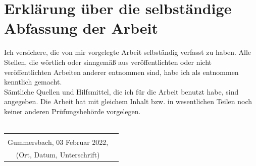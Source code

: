 \documentclass[a4paper,12pt,oneside]{article}
\begin{document}
\section*{Erklärung über die selbständige\\Abfassung der Arbeit} %
Ich versichere, die von mir vorgelegte Arbeit selbständig verfasst zu haben.
Alle Stellen, die wörtlich oder sinngemäß aus veröffentlichten oder nicht veröffentlichten Arbeiten anderer entnommen sind,
habe ich als entnommen kenntlich gemacht.\\
Sämtliche Quellen und Hilfsmittel, die ich für die Arbeit benutzt habe, sind
angegeben. Die Arbeit hat mit gleichem Inhalt bzw. in wesentlichen Teilen noch keiner anderen Prüfungsbehörde vorgelegen.\\\\
\begin{tabular}{cp{7cm}}
                                    &             \\
          Gummersbach, 03 Februar 2022,                  &             \\ \hline
  \small (Ort, Datum, Unterschrift) & \normalsize \\
\end{tabular}


\newpage
\thispagestyle{empty}

\end{document}
